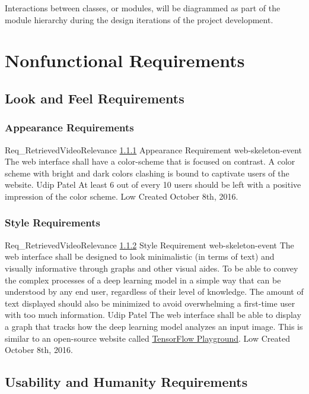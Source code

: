 \documentclass{scrreprt}
\begin{document}
Interactions between classes, or modules, will be diagrammed as part of the
module hierarchy during the design iterations of the project development.

\chapter{Nonfunctional Requirements}

\section{Look and Feel Requirements}

\subsection{Appearance Requirements}
\label{req-appearance}

\requirement
{Req_RetrievedVideoRelevance}
{\ref{req-appearance} Appearance Requirement}
{web-skeleton-event} %
{The web interface shall have a color-scheme that is focused on contrast.}
{A color scheme with bright and dark colors clashing is bound to captivate users of the website.}
{Udip Patel}
{At least 6 out of every 10 users should be left with a positive impression of the color scheme.}
{Low}
{Created October 8th, 2016.}

\subsection{Style Requirements}
\label{req-style}

\requirement
{Req_RetrievedVideoRelevance}
{\ref{req-style} Style Requirement}
{web-skeleton-event} %
{The web interface shall be designed to look minimalistic (in terms of text) and visually informative through graphs and other visual aides.}
{To be able to convey the complex processes of a deep learning model in a simple way that can be understood by any end user, regardless of their level of knowledge. The amount of text displayed should also be minimized to avoid overwhelming a first-time user with too much information.}
{Udip Patel}
{The web interface shall be able to display a graph that tracks how the deep learning model analyzes an input image. This is similar to an open-source website called \href{http://playground.tensorflow.org/}{TensorFlow Playground}.}
{Low}
{Created October 8th, 2016.}

\section{Usability and Humanity Requirements}
\end{document}
